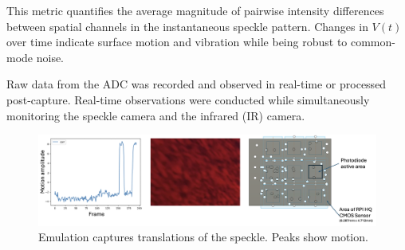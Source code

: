 This metric quantifies the average magnitude of pairwise intensity differences between spatial channels in the instantaneous speckle pattern. 
Changes in $V(t)$ over time indicate surface motion and vibration while being robust to common-mode noise.

Raw data from the ADC was recorded and observed in real-time or processed post-capture. 
Real-time observations were conducted while simultaneously monitoring the speckle camera and the infrared (IR) camera.

\begin{figure}[t]
  \centering
  \includegraphics[width=\textwidth]{figures/impl/emulated2.png}
  \caption{Emulation captures translations of the speckle. Peaks show motion.}
  \label{fig:emulated2}
\end{figure}
